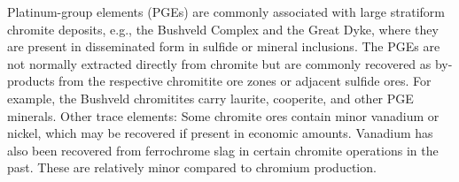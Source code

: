 \documentclass[12pt,a4paper, top=1.9cm, bottom=2.03cm, left=3.81cm, right=1.9cm]{article}
\begin{document}
\noindent\fontsize{12}{14}\selectfont Platinum-group elements (PGEs) are commonly associated with large stratiform chromite deposits, e.g., the Bushveld Complex and the Great Dyke, where they are present in disseminated form in sulfide or mineral inclusions. The PGEs are not normally extracted directly from chromite but are commonly recovered as by-products from the respective chromitite ore zones or adjacent sulfide ores. For example, the Bushveld chromitites carry laurite, cooperite, and other PGE minerals.
\noindent\fontsize{12}{14}\selectfont Other trace elements: Some chromite ores contain minor vanadium or nickel, which may be recovered if present in economic amounts. Vanadium has also been recovered from ferrochrome slag in certain chromite operations in the past. These are relatively minor compared to chromium production.
\end{document}
